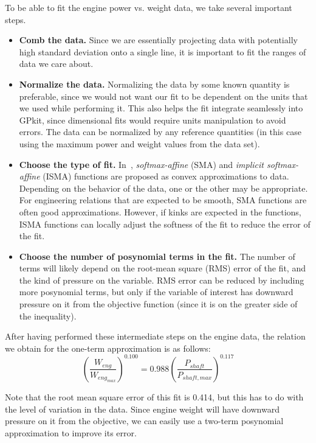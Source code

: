 To be able to fit the engine power vs. weight data, we take several important steps.
\begin{itemize}
    \item \textbf{Comb the data.} Since we are essentially projecting
    data with potentially high standard deviation onto a single line,
    it is important to fit the ranges of data we care about.
    \item \textbf{Normalize the data.} Normalizing the data
    by some known quantity is preferable, since we would not want our fit to be dependent on the
    units that we used while performing it. This also helps the fit integrate
    seamlessly into GPkit, since dimensional fits would require units manipulation
    to avoid errors. The data can be normalized by any
    reference quantities (in this case using the maximum power and weight values
    from the data set).
    \item \textbf{Choose the type of fit.} In~\cite{gpfitpaper}, \textit{softmax-affine}
    (SMA) and \textit{implicit softmax-affine} (ISMA)
    functions are proposed as convex approximations
    to data. Depending on the behavior of the data, one or the other
    may be appropriate. For engineering relations that are expected to be smooth, SMA
    functions are often good approximations. However, if kinks are expected in the
    functions, ISMA functions can locally adjust the softness of the fit to
    reduce the error of the fit.
    \item \textbf{Choose the number of posynomial terms in the fit.} The number of
    terms will likely depend on the root-mean square (RMS) error of the fit, and
    the kind of pressure on the variable. RMS error can be reduced by including
    more posynomial terms, but only if the variable of interest has downward
    pressure on it from the objective function (since it is on the greater side
    of the inequality).
\end{itemize}

After having performed these intermediate steps on the engine data,
the relation we obtain for the one-term approximation is as follows:
\begin{equation}
    (\frac{W_{eng}}{W_{eng_{max}}})^{0.100} = 0.988 (\frac{P_{shaft}}{P_{shaft,max}})^{0.117}
\end{equation}

Note that the root mean square error of this fit is 0.414, but this has to do with
the level of variation in the data. Since engine weight will have downward pressure
on it from the objective, we can easily use a two-term posynomial approximation to
improve its error.

